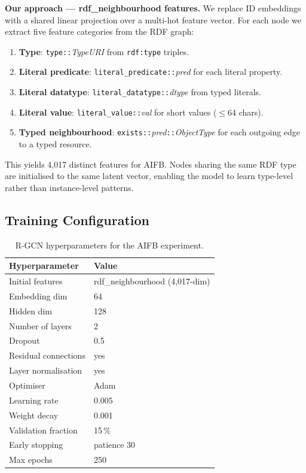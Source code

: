 \documentclass[runningheads]{llncs}
\begin{document}
\textbf{Our approach --- rdf\_neighbourhood features.}
We replace ID embeddings with a shared linear projection over a multi-hot feature vector.
For each node we extract five feature categories from the RDF graph:
\begin{enumerate}
    \item \textbf{Type}: \texttt{type::}\textit{TypeURI} from \texttt{rdf:type} triples.
    \item \textbf{Literal predicate}: \texttt{literal\_predicate::}\textit{pred} for each
          literal property.
    \item \textbf{Literal datatype}: \texttt{literal\_datatype::}\textit{dtype} from typed
          literals.
    \item \textbf{Literal value}: \texttt{literal\_value::}\textit{val} for short values
          ($\le$64 chars).
    \item \textbf{Typed neighbourhood}: \texttt{exists::}\textit{pred}\texttt{::}\textit{ObjectType}
          for each outgoing edge to a typed resource.
\end{enumerate}
This yields 4,017 distinct features for AIFB.
Nodes sharing the same RDF type are initialised to the same latent vector,
enabling the model to learn type-level rather than instance-level patterns.

\subsection{Training Configuration}

\begin{table}[ht]
\centering
\caption{R-GCN hyperparameters for the AIFB experiment.}
\label{tab:hyperparams}
\begin{tabular}{ll}
\toprule
\textbf{Hyperparameter} & \textbf{Value} \\
\midrule
Initial features     & rdf\_neighbourhood (4,017-dim) \\
Embedding dim        & 64 \\
Hidden dim           & 128 \\
Number of layers     & 2 \\
Dropout              & 0.5 \\
Residual connections & yes \\
Layer normalisation  & yes \\
Optimiser            & Adam \\
Learning rate        & 0.005 \\
Weight decay         & 0.001 \\
Validation fraction  & 15\,\% \\
Early stopping       & patience 30 \\
Max epochs           & 250 \\
\bottomrule
\end{tabular}
\end{table}
\end{document}

